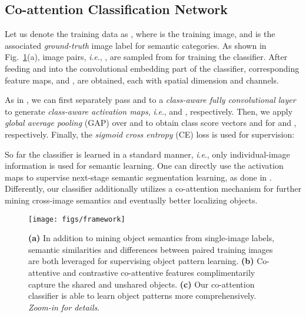 \documentclass[runningheads]{llncs}
\newcommand{\ie}{\textit{i}.\textit{e}.}
\begin{document}
\vspace{-7pt}
\subsection{Co-attention Classification Network}\label{co-cls}
\vspace{-3pt}
Let us denote the training data as , where  is the  training image, and  is the associated \textit{ground-truth} image label for  semantic categories. As shown in Fig.~\ref{fig:framework}(a), image pairs, \ie, , are sampled from  for training the classifier. After feeding  and  into the convolutional embedding part of the classifier, corresponding feature maps,   and , are obtained, each with  spatial dimension and  channels.

As in \cite{oaa2019,lee2019ficklenet,lee2019frame}, we can first separately pass  and  to a \textit{class-aware fully convolutional layer}  to generate \textit{class-aware activation maps}, \ie,  and , respectively. Then, we apply  \textit{global average pooling} (GAP) over  and  to obtain class score vectors  and  for  and , respectively. Finally, the \textit{sigmoid cross entropy} (CE) loss is used for supervision:
\vspace{-1pt}

So far the classifier is learned in a standard manner, \ie, only individual-image information is used for semantic learning. One can directly use the activation maps to supervise next-stage semantic segmentation learning, as done in \cite{dsrg2018,lee2019frame}. Differently, our classifier additionally utilizes a co-attention mechanism for further mining
cross-image semantics and eventually better localizing objects.

\begin{figure}[t]
\centering
      \texttt{[image: figs/framework]}
\vspace{-2pt}
\captionsetup{font=small}
\caption{\small{\textbf{(a)} In addition to mining object semantics from single-image labels, semantic similarities and differences between paired training images are both leveraged for supervising object pattern learning. \textbf{(b)} Co-attentive and contrastive co-attentive features complimentarily capture the shared and unshared objects. \textbf{(c)} Our co-attention classifier is able to learn object patterns more comprehensively. \textit{Zoom-in for details}.
}
}
\label{fig:framework}
\vspace{-8pt}
\end{figure}
\end{document}

